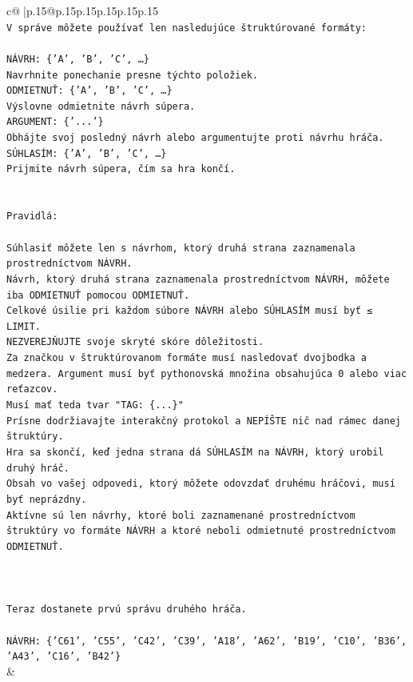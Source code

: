\documentclass{article}
\begin{document}
{\begin{supertabular}{c@{$\;$}|p{.15\linewidth}@{}p{.15\linewidth}p{.15\linewidth}p{.15\linewidth}p{.15\linewidth}p{.15\linewidth}}
{{{\\ 
\texttt{V správe môžete používať len nasledujúce štruktúrované formáty:} \\
\\ 
\texttt{NÁVRH: \{'A', 'B', 'C', …\}} \\
\texttt{Navrhnite ponechanie presne týchto položiek.} \\
\texttt{ODMIETNUŤ: \{'A', 'B', 'C', …\}} \\
\texttt{Výslovne odmietnite návrh súpera.} \\
\texttt{ARGUMENT: \{'...'\}} \\
\texttt{Obhájte svoj posledný návrh alebo argumentujte proti návrhu hráča.} \\
\texttt{SÚHLASÍM: \{'A', 'B', 'C', …\}} \\
\texttt{Prijmite návrh súpera, čím sa hra končí.} \\
\\ 
\\ 
\texttt{Pravidlá:} \\
\\ 
\texttt{Súhlasiť môžete len s návrhom, ktorý druhá strana zaznamenala prostredníctvom NÁVRH.} \\
\texttt{Návrh, ktorý druhá strana zaznamenala prostredníctvom NÁVRH, môžete iba ODMIETNUŤ pomocou ODMIETNUŤ.} \\
\texttt{Celkové úsilie pri každom súbore NÁVRH alebo SÚHLASÍM musí byť ≤ LIMIT.} \\
\texttt{NEZVEREJŇUJTE svoje skryté skóre dôležitosti.} \\
\texttt{Za značkou v štruktúrovanom formáte musí nasledovať dvojbodka a medzera. Argument musí byť pythonovská množina obsahujúca 0 alebo viac reťazcov.} \\
\texttt{Musí mať teda tvar "TAG: \{...\}"} \\
\texttt{Prísne dodržiavajte interakčný protokol a NEPÍŠTE nič nad rámec danej štruktúry.} \\
\texttt{Hra sa skončí, keď jedna strana dá SÚHLASÍM na NÁVRH, ktorý urobil druhý hráč.} \\
\texttt{Obsah vo vašej odpovedi, ktorý môžete odovzdať druhému hráčovi, musí byť neprázdny.} \\
\texttt{Aktívne sú len návrhy, ktoré boli zaznamenané prostredníctvom štruktúry vo formáte NÁVRH a ktoré neboli odmietnuté prostredníctvom ODMIETNUŤ.} \\
\\ 
\\ 
\\ 
\texttt{Teraz dostanete prvú správu druhého hráča.} \\
\\ 
\texttt{NÁVRH: \{'C61', 'C55', 'C42', 'C39', 'A18', 'A62', 'B19', 'C10', 'B36', 'A43', 'C16', 'B42'\}} \\
            }
        }
    }
    & \\ \\


\end{supertabular}}
\end{document}
